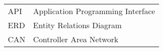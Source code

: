 \begin{longtable}{p{3cm}p{10cm}}
    API&Application Programming Interface\\
    ERD&Entity Relations Diagram\\
    CAN&Controller Area Network\\
\end{longtable}
\addtocounter{table}{-1}